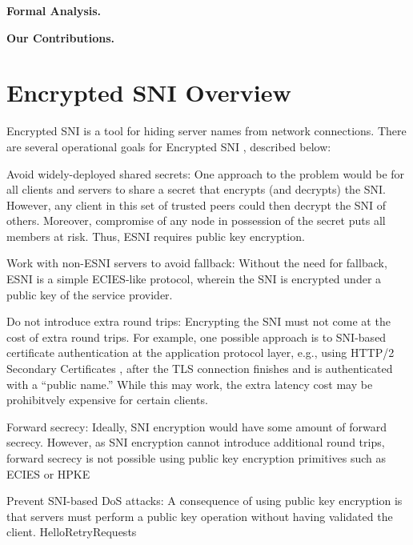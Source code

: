 \documentclass[twoside]{article}
\theoremstyle{definition}
\begin{document}
\textbf{Formal Analysis.} 

\textbf{Our Contributions.} 

\section{Encrypted SNI Overview}


Encrypted SNI is a tool for hiding server names from network connections. There are several operational goals 
for Encrypted SNI \cite{requirements}, described below:
%
\begin{compactitem}
  \item Avoid widely-deployed shared secrets: One approach to the problem would be for all
  clients and servers to share a secret that encrypts (and decrypts) the SNI. However, any 
  client in this set of trusted peers could then decrypt the SNI of others. Moreover, compromise
  of any node in possession of the secret puts all members at risk. Thus, ESNI requires 
  public key encryption.
  \item Work with non-ESNI servers to avoid fallback: Without the need for fallback, ESNI 
  is a simple ECIES-like protocol, wherein the SNI is encrypted under a public key of the 
  service provider.
  \item Do not introduce extra round trips: Encrypting the SNI must not come at the cost of 
  extra round trips. For example, one possible approach is to SNI-based certificate authentication
  at the application protocol layer, e.g., using HTTP/2 Secondary Certificates \cite{xxx}, after
  the TLS connection finishes and is authenticated with a ``public name.'' While this may work,
  the extra latency cost may be prohibitvely expensive for certain clients.
  \item Forward secrecy: Ideally, SNI encryption would have some amount of forward secrecy.
  However, as SNI encryption cannot introduce additional round trips, forward secrecy is not
  possible using public key encryption primitives such as ECIES \cite{XXX} or HPKE \cite{XXX}
  \item Prevent SNI-based DoS attacks: A consequence of using public key encryption is that
  servers must perform a public key operation without having validated the client. HelloRetryRequests

\end{compactitem}
\end{document}
